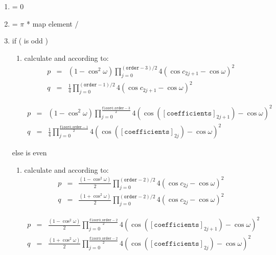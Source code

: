 \begin{enumerate}
 \item  \varname{[i]} = 0
 \item  \varname{[$\omega$]} = $\pi$ * map element \varname{[i]} / 
 \item if (  is odd ) {
  \begin{enumerate}
   \item calculate \varname{[p]} and \varname{[q]} according to:
           \begin{eqnarray*}
             p & = & (1 - \cos^2\omega)\prod_{j=0}^{(\mathtt{order}-3)/2} 4 (\cos c_{2j+1} - \cos \omega)^2 \\
             q & = & \frac{1}{4} \prod_{j=0}^{(\mathtt{order}-1)/2} 4 (\cos c_{2j+1} - \cos \omega)^2
           \end{eqnarray*}

           \begin{eqnarray*}
             p & = & (1 - \cos^2\omega)\prod_{j=0}^{\frac{\mathtt{floor0\_order}-3}{2}} 4 (\cos([\mathtt{coefficients}]_{2j+1}) - \cos \omega)^2 \\
             q & = & \frac{1}{4} \prod_{j=0}^{\frac{\mathtt{floor0\_order}-1}{2}} 4 (\cos([\mathtt{coefficients}]_{2j}) - \cos \omega)^2
           \end{eqnarray*}

  \end{enumerate}
  } else  is even {
  \begin{enumerate}
   \item calculate \varname{[p]} and \varname{[q]} according to:
           \begin{eqnarray*}
             p & = & \frac{(1 - \cos^2\omega)}{2} \prod_{j=0}^{(\mathtt{order}-2)/2} 4 (\cos c_{2j} - \cos \omega)^2 \\
             q & = & \frac{(1 + \cos^2\omega)}{2} \prod_{j=0}^{(\mathtt{order}-2)/2} 4 (\cos c_{2j} - \cos \omega)^2
           \end{eqnarray*}

           \begin{eqnarray*}
             p & = & \frac{(1 - \cos^2\omega)}{2} \prod_{j=0}^{\frac{\mathtt{floor0\_order}-2}{2}} 4 (\cos([\mathtt{coefficients}]_{2j+1}) - \cos \omega)^2 \\
             q & = & \frac{(1 + \cos^2\omega)}{2} \prod_{j=0}^{\frac{\mathtt{floor0\_order}-2}{2}} 4 (\cos([\mathtt{coefficients}]_{2j}) - \cos \omega)^2
           \end{eqnarray*}


\end{enumerate}}
\end{enumerate}

